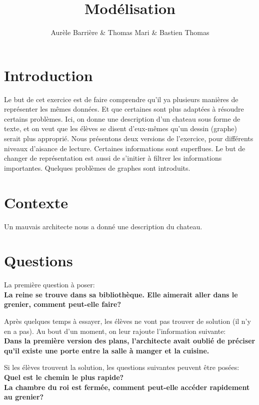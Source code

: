 \documentclass{article}
\title{Modélisation}
\author{Aurèle Barrière \& Thomas Mari \& Bastien Thomas}
\date{}
\begin{document}
\maketitle

\section{Introduction}
Le but de cet exercice est de faire comprendre qu'il ya plusieurs manières de représenter les mêmes données.
Et que certaines sont plus adaptées à résoudre certains problèmes.
Ici, on donne une description d'un chateau sous forme de texte, et on veut que les élèves se disent d'eux-mêmes qu'un dessin (graphe) serait plus approprié.
Nous présentons deux versions de l'exercice, pour différents niveaux d'aisance de lecture.
Certaines informations sont superflues. Le but de changer de représentation est aussi de s'initier à filtrer les informations importantes.
Quelques problèmes de graphes sont introduits.

\section{Contexte}
Un mauvais architecte nous a donné une description du chateau.

\section{Questions}
La première question à poser:\\
\textbf{La reine se trouve dans sa bibliothèque. Elle aimerait aller dans le grenier, comment peut-elle faire?}

Après quelques temps à essayer, les élèves ne vont pas trouver de solution (il n'y en a pas).
Au bout d'un moment, on leur rajoute l'information suivante:\\
\textbf{Dans la première version des plans, l'architecte avait oublié de préciser qu'il existe une porte entre la salle à manger et la cuisine.}

Si les élèves trouvent la solution, les questions suivantes peuvent être posées:\\
\textbf{Quel est le chemin le plus rapide?}\\
\textbf{La chambre du roi est fermée, comment peut-elle accéder rapidement au grenier?}
\end{document}
